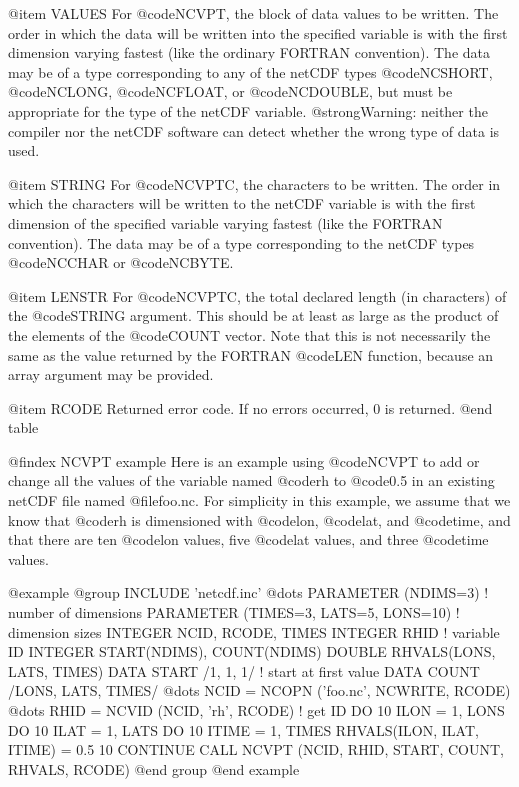 @item VALUES
For @code{NCVPT}, the block of data values to be written.  The order in
which the data will be written into the specified variable is with the
first dimension varying fastest (like the ordinary FORTRAN convention).
The data may be of a type corresponding to any of the netCDF types
@code{NCSHORT}, @code{NCLONG}, @code{NCFLOAT}, or @code{NCDOUBLE}, but
must be appropriate for the type of the netCDF variable.
@strong{Warning: neither the compiler nor the netCDF software can detect
whether the wrong type of data is used.}

@item STRING
For @code{NCVPTC}, the characters to be written.  The order in which the
characters will be written to the netCDF variable
is with the first dimension of the
specified variable
varying fastest (like the FORTRAN convention).  The data
may be of a type corresponding to the netCDF types @code{NCCHAR} or
@code{NCBYTE}.

@item LENSTR
For @code{NCVPTC}, the total declared length (in characters) of the
@code{STRING} argument.  This should be at least as large as the product
of the elements of the @code{COUNT} vector.  Note that this is not
necessarily the same as the value returned by the FORTRAN @code{LEN}
function, because an array argument may be provided.

@item RCODE
Returned error code.  If no errors occurred, 0 is returned.
@end table

@findex NCVPT example
Here is an example using @code{NCVPT} to add or change all the
values of the variable named @code{rh} to @code{0.5} in an existing
netCDF file named @file{foo.nc}.  For simplicity in this example, we
assume that we know that @code{rh} is dimensioned with @code{lon},
@code{lat}, and @code{time}, and that there are ten @code{lon} values, five
@code{lat} values, and three @code{time} values.

@example
@group
      INCLUDE 'netcdf.inc'
         @dots{}
      PARAMETER (NDIMS=3)         ! number of dimensions
      PARAMETER (TIMES=3, LATS=5, LONS=10) ! dimension sizes
      INTEGER  NCID, RCODE, TIMES
      INTEGER  RHID               ! variable ID
      INTEGER  START(NDIMS), COUNT(NDIMS)
      DOUBLE RHVALS(LONS, LATS, TIMES)
      DATA START /1, 1, 1/        ! start at first value
      DATA COUNT /LONS, LATS, TIMES/
         @dots{}
      NCID = NCOPN ('foo.nc', NCWRITE, RCODE)
         @dots{}
      RHID = NCVID (NCID, 'rh', RCODE)   ! get ID
      DO 10 ILON = 1, LONS
         DO 10 ILAT = 1, LATS
            DO 10 ITIME = 1, TIMES
               RHVALS(ILON, ILAT, ITIME) = 0.5
   10 CONTINUE
      CALL NCVPT (NCID, RHID, START, COUNT, RHVALS, RCODE)
@end group
@end example

